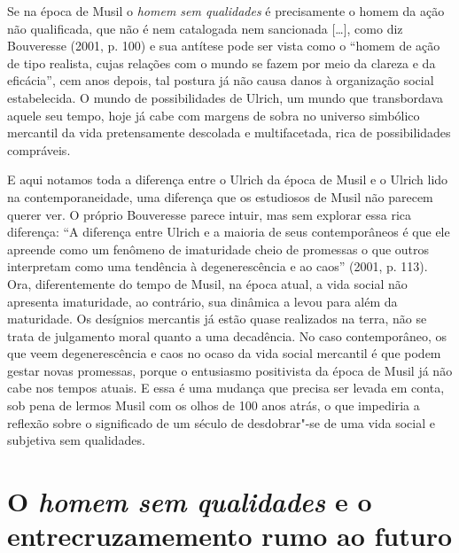 Se na época de Musil o \emph{homem sem qualidades} é precisamente o
homem da ação não qualificada, que não é nem catalogada nem sancionada
[\ldots{}], como diz Bouveresse (2001, p. 100) e sua antítese pode
ser vista como o ``homem de ação de tipo realista, cujas relações com o
mundo se fazem por meio da clareza e da eficácia'', cem anos depois, tal
postura já não causa danos à organização social estabelecida. O mundo de
possibilidades de Ulrich, um mundo que transbordava aquele seu tempo,
hoje já cabe com margens de sobra no universo simbólico mercantil da
vida pretensamente descolada e multifacetada, rica de possibilidades
compráveis.

E aqui notamos toda a diferença entre o Ulrich da época de Musil e o
Ulrich lido na contemporaneidade, uma diferença que os estudiosos de Musil
não parecem querer ver. O próprio Bouveresse parece intuir, mas sem
explorar essa rica diferença: ``A diferença entre Ulrich e a maioria de
seus contemporâneos é que ele apreende como um fenômeno de imaturidade
cheio de promessas o que outros interpretam como uma tendência à
degenerescência e ao caos'' (2001, p. 113). Ora, diferentemente do
tempo de Musil, na época atual, a vida social não apresenta imaturidade,
ao contrário, sua dinâmica a levou para além da maturidade. Os desígnios
mercantis já estão quase realizados na terra, não se trata de julgamento
moral quanto a uma decadência. No caso contemporâneo, os que veem
degenerescência e caos no ocaso da vida social mercantil é que podem
gestar novas promessas, porque o entusiasmo positivista da época de
Musil já não cabe nos tempos atuais. E essa é uma mudança que precisa
ser levada em conta, sob pena de lermos Musil com os olhos de 100 anos
atrás, o que impediria a reflexão sobre o significado de um século de
desdobrar"-se de uma vida social e subjetiva sem qualidades.

\section{O \emph{homem sem qualidades} e o entrecruzamemento rumo ao futuro}

